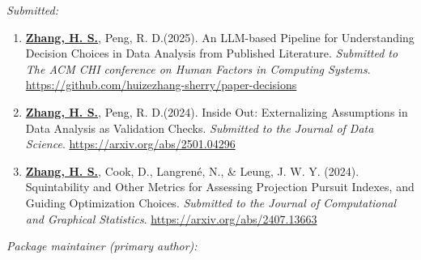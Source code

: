 \documentclass[10pt,a4paper]{article} %
\begin{document}

% 

\noindent\textit{Submitted:}\vspace{-0.5em}
\begin{enumerate}[resume]

    \item \underline{\textbf{Zhang, H. S.}}, Peng, R. D.(2025). An LLM-based Pipeline for 
    Understanding Decision Choices in Data Analysis from Published Literature. 
    \emph{Submitted to The ACM CHI conference on Human Factors in Computing Systems}. 
    \url{https://github.com/huizezhang-sherry/paper-decisions}

    \item \underline{\textbf{Zhang, H. S.}}, Peng, R. D.(2024). Inside Out: Externalizing Assumptions 
    in Data Analysis as Validation Checks. \emph{Submitted to the Journal of Data Science}. 
    \url{https://arxiv.org/abs/2501.04296}
    
    \item \underline{\textbf{Zhang, H. S.}}, Cook, D., Langren\'e, N., \& Leung, J. W. Y. (2024). 
    Squintability and Other Metrics for Assessing Projection Pursuit Indexes, and Guiding 
    Optimization Choices. \emph{Submitted to the Journal of Computational and Graphical 
    Statistics}. \url{https://arxiv.org/abs/2407.13663}
\end{enumerate}


\noindent\textit{Package maintainer (primary author):}

\vspace{0.5em}

 \newline 
{} \newline
{} \newline 
\end{document}
